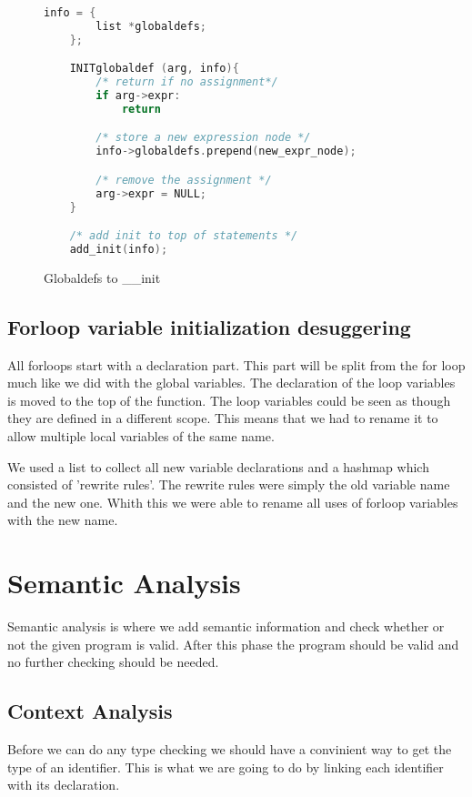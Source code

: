 \documentclass[a4paper]{article}
\begin{document}
\begin{figure}[h]
    \begin{lstlisting}[language=C, frame=single]
    info = {
        list *globaldefs;
    };

    INITglobaldef (arg, info){
        /* return if no assignment*/
        if arg->expr:
            return

        /* store a new expression node */
        info->globaldefs.prepend(new_expr_node);

        /* remove the assignment */
        arg->expr = NULL;
    }

    /* add init to top of statements */
    add_init(info);
    \end{lstlisting}
    \caption{Globaldefs to \_\_init}
    \label{fig:init}
\end{figure}

\subsection{Forloop variable initialization desuggering}
All forloops start with a declaration part. This part will be split from the
for loop much like we did with the global variables. The declaration of the
loop variables is moved to the top of the function. The loop variables could be
seen as though they are defined in a different scope. This means that we had to
rename it to allow multiple local variables of the same name.

We used a list to collect all new variable declarations and a hashmap which
consisted of 'rewrite rules'. The rewrite rules were simply the old variable
name and the new one. Whith this we were able to rename all uses of forloop
variables with the new name.

\section{Semantic Analysis}
Semantic analysis is where we add semantic information and check whether or not
the given program is valid. After this phase the program should be valid and no
further checking should be needed.

\subsection{Context Analysis}
Before we can do any type checking we should have a convinient way to get the
type of an identifier. This is what we are going to do by linking each
identifier with its declaration.
\end{document}
